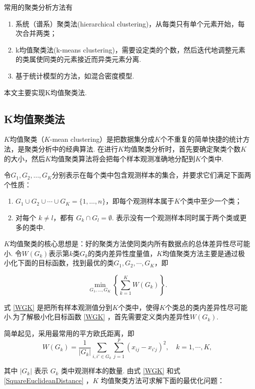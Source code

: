 \documentclass[12pt, a4paper, oneside]{ctexart}
\begin{document}
	常用的聚类分析方法有
	\begin{enumerate}[(1)]
		\item 系统（谱系）聚类法(hierarchical clustering)，从每类只有单个元素开始，每次合并两类；
		\item k均值聚类法(k-means clustering)，需要设定类的个数，然后迭代地调整元素的类属使同类的元素接近而异类元素分离.
		\item 基于统计模型的方法，如混合密度模型.
	\end{enumerate}
	本文主要实现K均值聚类法.
	\subsection{K均值聚类法}
	$K$均值聚类（$K$-mean clustering）是把数据集分成$K$个不重复的简单快捷的统计方法，是聚类分析中的经典算法. 在进行$K$均值聚类分析时，首先要确定聚类个数$K$的大小，然后$K$均值聚类算法将会把每个样本观测准确地分配到$K$个类中.
	
	令$G_1, G_2, \dots, G_K$分别表示在每个类中包含观测样本的集合，并要求它们满足下面两个性质：
	
	\begin{enumerate}[(1)]
		\item $G_1 \cup G_2 \cup \cdots \cup G_K = \{1, \dots, n\}$，即每个观测样本属于$K$个类中至少一个类；
		\item 对每个 $k \ne l$，都有 $G_k \cap G_l = \emptyset$. 表示没有一个观测样本同时属于两个类或更多的类中.
	\end{enumerate}
	
	$K$均值聚类的核心思想是：好的聚类方法使同类内所有数据点的总体差异性尽可能小. 令$W(G_k)$表示第$k$类$G_k$的类内差异性度量值，$K$均值聚类方法主要是通过极小化下面的目标函数，找到最优的类$G_1, G_2, \cdots, G_K$，即
	
	\begin{equation}
		\min_{G_1, \dots, G_K} \left\{ \sum_{k=1}^{K} W(G_k) \right\}.
		\label{WGK}
	\end{equation}
	
	式 \eqref{WGK} 是把所有样本观测值分到$K$个类中，使得$K$个类总的类内差异性尽可能小.为了解极小化目标函数 \eqref{WGK} ，首先需要定义类内差异性$W(G_k)$.
	
	简单起见，采用最常用的平方欧氏距离，即
	\begin{equation}
		W(G_k) = \frac{1}{|G_k|} \sum_{i,i' \in G_k} \sum_{j=1}^{p} (x_{ij} - x_{i'j})^2, \quad k = 1, \cdots, K,
		\label{SquareEuclideanDistance}
	\end{equation}
	
	其中 $|G_k|$ 表示 $G_k$ 类中观测样本的数量. 由式 \eqref{WGK} 和式 \eqref{SquareEuclideanDistance} ，$K$ 均值聚类方法可求解下面的最优化问题：
	
\end{document}
